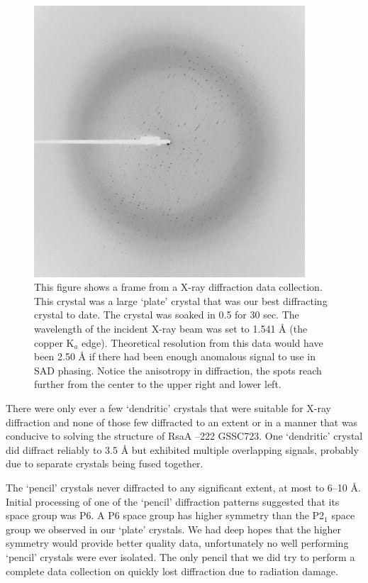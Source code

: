 \begin{figure}[htb]
  	\begin{center}
   		\includegraphics[width=0.9\textwidth]{crystal_chapter/img/rsaadiffraction.pdf}
   	\end{center}
   	\caption[A diffraction pattern of RsaA --222, `plate' crystal]{This figure shows a frame from a X-ray diffraction data collection. 
This crystal was a large `plate' crystal that was our best diffracting crystal to date. The crystal was soaked in 0.5
 \si{\molar} 
for 30 sec. The wavelength of the incident X-ray beam was set to 1.541 \AA{} (the copper K$_{a}$ edge). Theoretical resolution from this data would have been 2.50 \AA{} if there had been enough anomalous signal to use in \ac{SAD} phasing. Notice the anisotropy in diffraction, \ie the spots reach further from the center to the upper right and lower left.}
   	\label{fig:diffraction}
\end{figure}   

There were only ever a few `dendritic' crystals that were suitable for X-ray diffraction and none of those few diffracted to an extent or in a manner that was conducive to solving the structure of RsaA --222 GSSC723. One `dendritic' crystal did diffract reliably to 3.5 \AA{} but exhibited multiple overlapping signals, probably due to separate crystals being fused together.  

The `pencil' crystals never diffracted to any significant extent, at most to 6--10 \AA{}. Initial processing of one of the `pencil' diffraction patterns suggested that its space group was P6. A P6 space group has higher symmetry than the P2$_{1}$ space group we observed in our `plate' crystals. We had deep hopes that the higher symmetry would provide better quality data, unfortunately no well performing `pencil' crystals were ever isolated. The only pencil that we did try to perform a complete data collection on quickly lost diffraction due to radiation damage.

